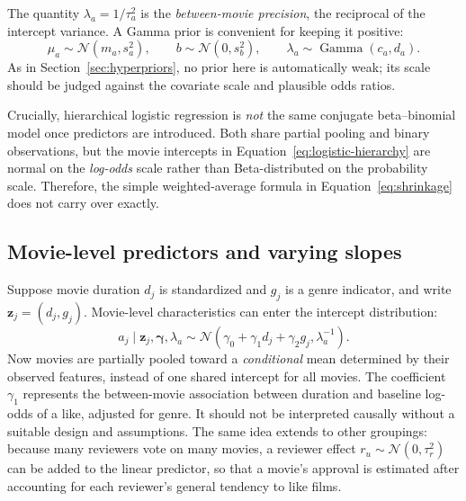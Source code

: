 \documentclass[11pt,a4paper]{article}
\newcommand{\Normal}{\mathcal{N}}
\newcommand{\Gam}{\operatorname{Gamma}}
\begin{document}
The quantity $\lambda_a=1/\tau_a^2$ is the \emph{between-movie precision}, the reciprocal of the intercept variance. A Gamma prior is convenient for keeping it positive:
\begin{equation}
 \mu_a\sim\Normal(m_a,s_a^2),\qquad
 b\sim\Normal(0,s_b^2),\qquad
 \lambda_a\sim\Gam(c_a,d_a).
 \label{eq:regression-hyperpriors}
\end{equation}
As in Section~\ref{sec:hyperpriors}, no prior here is automatically weak; its scale should be judged against the covariate scale and plausible odds ratios.

Crucially, hierarchical logistic regression is \emph{not} the same conjugate beta--binomial model once predictors are introduced. Both share partial pooling and binary observations, but the movie intercepts in Equation~\eqref{eq:logistic-hierarchy} are normal on the \emph{log-odds} scale rather than Beta-distributed on the probability scale. Therefore, the simple weighted-average formula in Equation~\eqref{eq:shrinkage} does not carry over exactly.

\subsection{Movie-level predictors and varying slopes}
Suppose movie duration $d_j$ is standardized and $g_j$ is a genre indicator, and write $\bm z_j=(d_j,g_j)$. Movie-level characteristics can enter the intercept distribution:
\begin{equation}
 a_j\mid\bm z_j,\bm\gamma,\lambda_a
 \sim\Normal(\gamma_0+\gamma_1d_j+\gamma_2g_j,\lambda_a^{-1}).
 \label{eq:movie-predictors}
\end{equation}
Now movies are partially pooled toward a \emph{conditional} mean determined by their observed features, instead of one shared intercept for all movies. The coefficient $\gamma_1$ represents the between-movie association between duration and baseline log-odds of a like, adjusted for genre. It should not be interpreted causally without a suitable design and assumptions. The same idea extends to other groupings: because many reviewers vote on many movies, a reviewer effect $r_u\sim\Normal(0,\tau_r^2)$ can be added to the linear predictor, so that a movie's approval is estimated after accounting for each reviewer's general tendency to like films.
\end{document}
